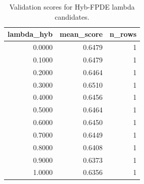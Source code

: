 \begin{table}[t]
\caption{Validation scores for Hyb-FPDE lambda candidates.}
\label{tab:lambda_distribution_computed}
\centering
\begin{tabular}{rrr}
\toprule
lambda\_hyb & mean\_score & n\_rows \\
\midrule
0.0000 & 0.6479 & 1 \\
0.1000 & 0.6479 & 1 \\
0.2000 & 0.6464 & 1 \\
0.3000 & 0.6510 & 1 \\
0.4000 & 0.6456 & 1 \\
0.5000 & 0.6464 & 1 \\
0.6000 & 0.6450 & 1 \\
0.7000 & 0.6449 & 1 \\
0.8000 & 0.6408 & 1 \\
0.9000 & 0.6373 & 1 \\
1.0000 & 0.6356 & 1 \\
\bottomrule
\end{tabular}

\end{table}

